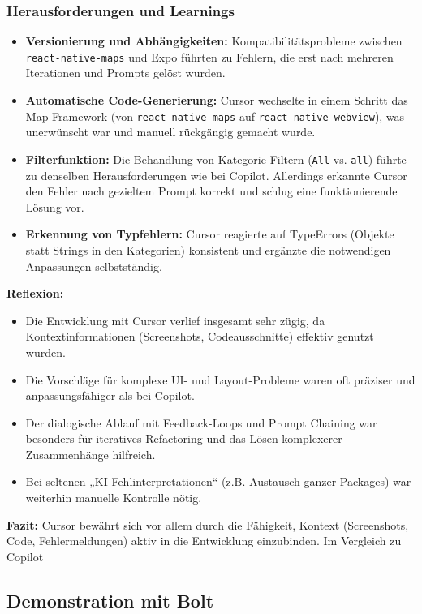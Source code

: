 \subsubsection{Herausforderungen und Learnings}
\begin{itemize}
      \item \textbf{Versionierung und Abhängigkeiten:} Kompatibilitätsprobleme zwischen \texttt{react-native-maps} und Expo führten zu Fehlern, die erst nach mehreren Iterationen und Prompts gelöst wurden.
      \item \textbf{Automatische Code-Generierung:} Cursor wechselte in einem Schritt das Map-Framework (von \texttt{react-native-maps} auf \texttt{react-native-webview}), was unerwünscht war und manuell rückgängig gemacht wurde.
      \item \textbf{Filterfunktion:} Die Behandlung von Kategorie-Filtern (\texttt{All} vs. \texttt{all}) führte zu denselben Herausforderungen wie bei Copilot. Allerdings erkannte Cursor den Fehler nach gezieltem Prompt korrekt und schlug eine funktionierende Lösung vor.
      \item \textbf{Erkennung von Typfehlern:} Cursor reagierte auf TypeErrors (Objekte statt Strings in den Kategorien) konsistent und ergänzte die notwendigen Anpassungen selbstständig.
\end{itemize}

\textbf{Reflexion:}
\begin{itemize}
      \item Die Entwicklung mit Cursor verlief insgesamt sehr zügig, da
            Kontextinformationen (Screenshots, Codeausschnitte) effektiv genutzt wurden.
      \item Die Vorschläge für komplexe UI- und Layout-Probleme waren oft präziser und
            anpassungsfähiger als bei Copilot.
      \item Der dialogische Ablauf mit Feedback-Loops und Prompt Chaining war besonders für
            iteratives Refactoring und das Lösen komplexerer Zusammenhänge hilfreich.
      \item Bei seltenen „KI-Fehlinterpretationen“ (z.B. Austausch ganzer Packages) war
            weiterhin manuelle Kontrolle nötig.
\end{itemize}

\textbf{Fazit:}
Cursor bewährt sich vor allem durch die Fähigkeit, Kontext (Screenshots, Code, Fehlermeldungen) aktiv in die Entwicklung einzubinden. Im Vergleich zu Copilot

\subsection{Demonstration mit Bolt}

